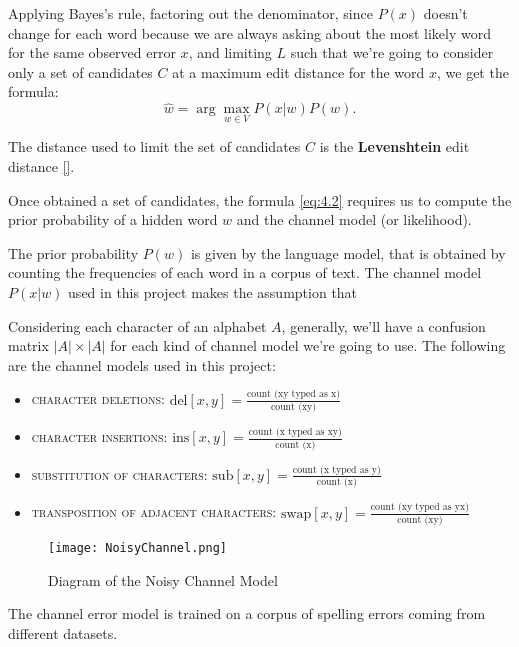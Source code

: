 Applying Bayes's rule, factoring out the denominator, since $P(x)$ doesn’t change for each word because we 
are always asking about the most likely word for the same observed error $x$,  and limiting $L$ such that we're 
going to consider only a set of candidates $C$ at a maximum edit distance for the word $x$, we get the formula:
\begin{equation}\label{eq:4.2}
\hat{w} = \arg\max_{w \in V} {P(x|w)P(w)} \mbox{.}
\end{equation}

The distance used to limit the set of candidates $C$ is the \textbf{Levenshtein} edit distance \ref{}.	

Once obtained a set of candidates, the formula \ref{eq:4.2} requires us to compute the prior probability of a 
hidden word $w$ and the channel model (or likelihood).

The prior probability $P(w)$ is given by the language model, that is obtained by counting the frequencies of 
each word in a corpus of text.  
The channel model $P(x|w)$ used in this project makes the assumption that 

Considering each character of an alphabet $A$, generally, we'll have a confusion matrix $|A|\times|A|$ for each 
kind of channel model we're going to use. The following are the channel models used in this project:
\begin{itemize}
	\item \textsc{character deletions}: $\mbox{del}[x, y] = \frac{\mbox{count (xy  typed as x)}} 
	{\mbox{count (xy)}}$
	\item \textsc{character insertions}: $\mbox{ins}[x, y] = \frac{\mbox{count (x  typed as xy)}} 
	{\mbox{count (x)}}$
	\item \textsc{substitution of characters}: $\mbox{sub}[x, y] = \frac{\mbox{count (x  typed as y)}} 
	{\mbox{count (x)}}$
	\item \textsc{transposition of adjacent characters}: $\mbox{swap}[x, y] = \frac{\mbox{count (xy  typed as 
	yx)}} 
	{\mbox{count (xy)}}$
\end{itemize}

\begin{figure}[H]
	\centering
	\texttt{[image: NoisyChannel.png]}
	\caption{Diagram of the Noisy Channel Model}
	\label{fig:noisychannel}
\end{figure}

The channel error model is trained on a corpus of spelling errors coming from different datasets.

